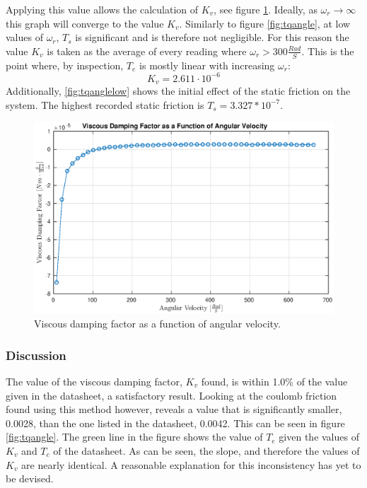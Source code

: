 Applying this value allows the calculation of $K_v$, see figure \ref{fig:visvel}.
Ideally, as $\omega_r\rightarrow \infty$ this graph will converge to the value $K_v$. 
Similarly to figure \ref{fig:tqangle}, at low values of $\omega_r$, $T_s$ is significant and is therefore not negligible.
For this reason the value $K_v$ is taken as the average of every reading where $\omega_r>300\frac{Rad}{S}$. 
This is the point where, by inspection, $T_e$ is mostly linear with increasing $\omega_r$:
$$K_v=2.611\cdot 10^{-6}$$
Additionally, \ref{fig:tqanglelow} shows the initial effect of the static friction on the system.
The highest recorded static friction is $T_s=3.327*10^{-7}$.
\begin{figure}[!h]
	\centering
	\includegraphics[width=.75\linewidth]{graphics/visvel}
	\caption{Viscous damping factor as a function of angular velocity.}
	\label{fig:visvel}
\end{figure}
\subsubsection{Discussion}
The value of the viscous damping factor, $K_v$ found, is within 1.0\% of the value given in the datasheet, a satisfactory result.
Looking at the coulomb friction found using this method however, reveals a value that is significantly smaller, 0.0028, than the one listed in the datasheet, 0.0042.
This can be seen in figure \ref{fig:tqangle}. 
The green line in the figure shows the value of $T_e$ given the values of $K_v$ and $T_c$ of the datasheet.
As can be seen, the slope, and therefore the values of $K_v$ are nearly identical.
A reasonable explanation for this inconsistency has yet to be devised.

